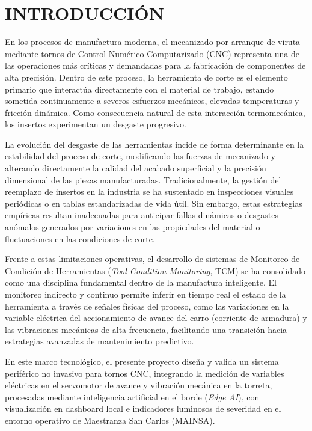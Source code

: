 \newpage
\section{INTRODUCCIÓN}

En los procesos de manufactura moderna, el mecanizado por arranque de viruta mediante tornos de Control Numérico Computarizado (CNC) representa una de las operaciones más críticas y demandadas para la fabricación de componentes de alta precisión. Dentro de este proceso, la herramienta de corte es el elemento primario que interactúa directamente con el material de trabajo, estando sometida continuamente a severos esfuerzos mecánicos, elevadas temperaturas y fricción dinámica. Como consecuencia natural de esta interacción termomecánica, los insertos experimentan un desgaste progresivo.

La evolución del desgaste de las herramientas incide de forma determinante en la estabilidad del proceso de corte, modificando las fuerzas de mecanizado y alterando directamente la calidad del acabado superficial y la precisión dimensional de las piezas manufacturadas. Tradicionalmente, la gestión del reemplazo de insertos en la industria se ha sustentado en inspecciones visuales periódicas o en tablas estandarizadas de vida útil. Sin embargo, estas estrategias empíricas resultan inadecuadas para anticipar fallas dinámicas o desgastes anómalos generados por variaciones en las propiedades del material o fluctuaciones en las condiciones de corte.

Frente a estas limitaciones operativas, el desarrollo de sistemas de Monitoreo de Condición de Herramientas (\textit{Tool Condition Monitoring}, TCM) se ha consolidado como una disciplina fundamental dentro de la manufactura inteligente. El monitoreo indirecto y continuo permite inferir en tiempo real el estado de la herramienta a través de señales físicas del proceso, como las variaciones en la variable eléctrica del accionamiento de avance del carro (corriente de armadura) y las vibraciones mecánicas de alta frecuencia, facilitando una transición hacia estrategias avanzadas de mantenimiento predictivo.

En este marco tecnológico, el presente proyecto diseña y valida un sistema periférico no invasivo para tornos CNC, integrando la medición de variables eléctricas en el servomotor de avance y vibración mecánica en la torreta, procesadas mediante inteligencia artificial en el borde (\textit{Edge AI}), con visualización en dashboard local e indicadores luminosos de severidad en el entorno operativo de Maestranza San Carlos (MAINSA).
